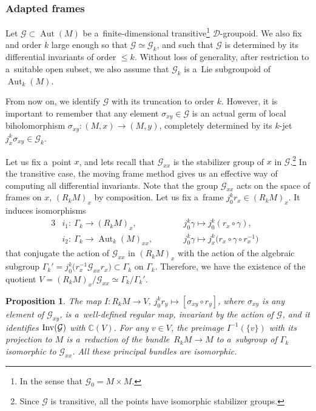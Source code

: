 \documentclass[10pt,a4paper]{amsart}
\numberwithin{equation}{section}
\newtheorem{Proposition}[Theorem]{Proposition}
\theoremstyle{definition}
\begin{document}
\subsubsection{Adapted frames}

Let $\mathcal G\subset \operatorname{Aut}(M)$ be a~finite-dimensional transitive\footnote{In the sense that $\mathcal G_{0} = M\times M$.} $\mathcal D$-groupoid. We also fix and order $k$ large enough so that $\mathcal G\simeq \mathcal G_k$, and such that $\mathcal G$ is determined by its differential invariants of order $\leq k$. Without loss of generality, after restriction to a~suitable open subset, we also assume that $\mathcal G_k$ is a~Lie subgroupoid of $\operatorname{Aut}_k(M)$.

From now on, we identify $\mathcal G$ with its truncation to order $k$. However, it is important to remember that any element $\sigma_{xy}\in \mathcal G$ is an actual germ of local biholomorphism ${\sigma_{xy}\colon (M,x)\to (M,y)}$, completely determined by its $k$-jet $j^k_x\sigma_{xy}\in \mathcal G_k$.

Let us fix a~point $x$, and lets recall that $\mathcal G_{xx}$ is the stabilizer group of $x$ in $\mathcal G$.\footnote{Since $\mathcal G$ is transitive, all the points have isomorphic stabilizer groups.}
In the transitive case, the moving frame method gives us an effective way of computing all differential invariants. Note that the group $\mathcal G_{xx}$ acts on the space of frames on $x$, $(R_kM)_x$ by composition. Let us fix a~frame $j_0^kr_x \in (R_kM)_x$. It induces isomorphisms
\begin{alignat*}{3}
& i_1\colon\ \Gamma_k \to (R_kM)_x, \qquad&& j_0^k\gamma \mapsto j_0^k(r_x \circ \gamma),&
\\
& i_2 \colon\ \Gamma_k \to \operatorname{Aut}_k(M)_{xx}, \qquad&& j_0^k\gamma \mapsto j_x^k\bigl(r_x \circ \gamma\circ r_x^{-1}\bigr)&
\end{alignat*}
that conjugate the action of $\mathcal G_{xx}$ in $(R_kM)_x$ with the action of the algebraic subgroup $\Gamma_k' = j_0^k\bigl(r_{x}^{-1}\mathcal G_{xx}r_x\bigr) \subset \Gamma_k$ on $\Gamma_k$. Therefore, we have the existence of the quotient $V = (R_kM)_x/\mathcal G_{xx} \simeq \Gamma_k/\Gamma_k'$.

\begin{Proposition}\label{prop_dinvariant}
 The map $I\colon R_kM \to V$, $ j_0^kr_y \mapsto [\sigma_{xy}\circ r_y]$,
where $\sigma_{xy}$ is any element of $\mathcal G_{xy}$, is a~well-defined regular map, invariant by the action of $\mathcal G$, and it identifies ${\rm Inv}(\mathcal G)$ with $\mathbb C(V)$. For any $v\in V$, the preimage $I^{-1}(\{v\})$ with its projection to $M$ is a~reduction of the bundle~${R_kM\to M}$ to a~subgroup of $\Gamma_k$ isomorphic to $\mathcal G_{xx}$. All these principal bundles are isomorphic.
\end{Proposition}
\end{document}

